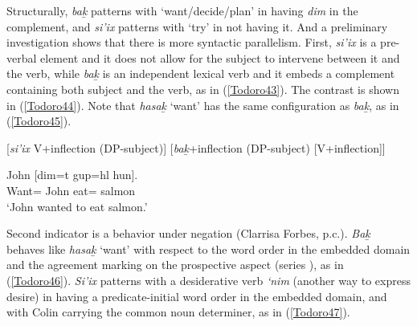 \documentclass[output=paper]{langscibook}
\begin{document}
Structurally, \emph{bak̲} patterns with ‘want/decide/plan’ in having \emph{dim} in the complement, and \emph{si’ix} patterns with ‘try’ in not having it. And a preliminary investigation shows that there is more syntactic parallelism.
First, \emph{si’ix} is a pre-verbal element and it does not allow for the subject to intervene between it and the verb, while \emph{bak̲} is an independent lexical verb and it embeds a complement containing both subject and the verb, as in (\ref{Todoro43}). The contrast is shown in (\ref{Todoro44}). Note that \emph{hasak̲} ‘want’ has the same configuration as \emph{bak̲}, as in (\ref{Todoro45}). 

\begin{exe}\judgewidth{\#}
\ex \label{Todoro43}
\begin{xlist}

\ex \label{Todoroa}
[\emph{si'ix} 	 V+inflection	(DP-subject)]
\ex \label{Todorob}
[\emph{bak̲}+inflection (DP-subject) [V+inflection]]
\end{xlist}

\ex \label{Todoro44}
\begin{xlist}



\end{xlist}

\ex \label{Todoro45}
 	{John} [{dim=t} 		{gup=hl}        {hun}]. \\
    Want=        John 	eat=     salmon\\
\glt `John wanted to eat salmon.' 
\end{exe}

Second indicator is a behavior  under negation (Clarrisa Forbes, p.c.). \emph{Bak̲}  behaves  like \emph{hasak̲} ‘want’ with respect to the word order in the embedded domain and the agreement marking on the prospective aspect (series ), as in (\ref{Todoro46}). \emph{Si’ix} patterns with a desiderative verb \emph{‘nim} (another way to express desire) in having  a predicate-initial word order in the embedded domain, and with Colin carrying the common noun determiner, as in (\ref{Todoro47}). 
\end{document}
